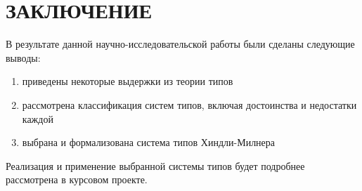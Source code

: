 \chapter*{ЗАКЛЮЧЕНИЕ}
\label{ch:chap_conclusion}

В результате данной научно-исследовательской работы были сделаны следующие выводы:

\begin{enumerate}
    \item приведены некоторые выдержки из теории типов
    \item рассмотрена классификация систем типов, включая достоинства и недостатки каждой
    \item выбрана и формализована система типов Хиндли-Милнера
\end{enumerate}

Реализация и применение выбранной системы типов будет подробнее рассмотрена в курсовом проекте.

